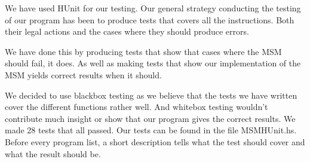 \documentclass[]{article}
\begin{document}
We have used HUnit for our testing. Our general strategy conducting the testing of our program has been to produce tests that covers all the instructions. Both their legal actions and the cases where they should produce errors. \par
We have done this by producing tests that show that cases where the MSM should fail, it does. As well as making tests that show our implementation of the MSM yields correct results when it should.\par
We decided to use blackbox testing as we believe that the tests we have written cover the different functions rather well. And whitebox testing wouldn’t contribute much insight or show that our program gives the correct results. We made 28 tests that all passed.
Our tests can be found in the file MSMHUnit.hs. Before every program list, a short description tells what the test should cover and what the result should be. \par


\end{document}
